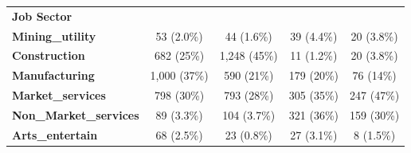 \begin{table}
{\begin{tabular}[t]{>{}lcccc}
\textbf{Job Sector} &  &  &  & \\
\textbf{Mining\_utility} & 53 (2.0\%) & 44 (1.6\%) & 39 (4.4\%) & 20 (3.8\%)\\
\addlinespace
\textbf{Construction} & 682 (25\%) & 1,248 (45\%) & 11 (1.2\%) & 20 (3.8\%)\\
\textbf{Manufacturing} & 1,000 (37\%) & 590 (21\%) & 179 (20\%) & 76 (14\%)\\
\textbf{Market\_services} & 798 (30\%) & 793 (28\%) & 305 (35\%) & 247 (47\%)\\
\textbf{Non\_Market\_services} & 89 (3.3\%) & 104 (3.7\%) & 321 (36\%) & 159 (30\%)\\
\textbf{Arts\_entertain} & 68 (2.5\%) & 23 (0.8\%) & 27 (3.1\%) & 8 (1.5\%)\\
\bottomrule
\end{tabular}}
\end{table}\newpage

